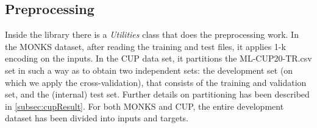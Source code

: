 \subsection{Preprocessing}
Inside the library there is a \textit{Utilities} class that does the preprocessing work. In the MONKS dataset, after reading the training and test files, it applies 1-k encoding on the inputs. In the CUP data set, it partitions the ML-CUP20-TR.csv set in such a way as to obtain two independent sets: the development set (on which we apply the cross-validation), that consists of the training and validation set, and the (internal) test set. Further details on partitioning has been described in \ref{subsec:cupResult}. For both MONKS and CUP, the entire development dataset has been divided into inputs and targets.


